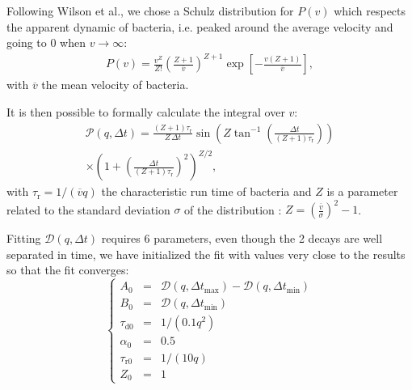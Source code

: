 \documentclass[%
 aip,
 jmp,%
 amsmath,amssymb,
reprint,%
]{revtex4-1}
\begin{document}
Following Wilson et al.\cite{1_BactMobil}, we chose a Schulz distribution for $P(v)$ which respects the apparent dynamic of bacteria, i.e. peaked around the average velocity and going to 0 when $v \rightarrow \infty$:
\begin{multline}
P(v) = \frac{v^Z}{Z!} \left(\frac{Z+1}{\overline{v}}\right)^{Z+1} \exp\left[-\frac{v(Z+1)}{\overline{v}}\right],
\end{multline}
with $\overline{v}$ the mean velocity of bacteria.

It is then possible to formally calculate the integral over $v$:
\begin{multline}
\mathcal{P}(q, \Delta t) = \frac{(Z+1)\tau_\text{r}}{Z \, \Delta t} \sin\left(Z\tan^{-1}\left(\frac{\Delta t}{(Z+1)\tau_\text{r}}\right)\right)\\
\times \left(1+\left(\frac{\Delta t}{(Z+1)\tau_\text{r}}\right)^2\right)^{Z/2},
\end{multline}
with $\tau_\text{r} = 1/(\overline{v}q)$ the characteristic run time of bacteria and $Z$ is a parameter related to the standard deviation $\sigma$ of the distribution : $Z = \left( \frac{\overline{v}}{\sigma} \right)^2 -1$. 

Fitting $\mathcal{D}(q, \Delta t)$ requires 6 parameters, even though the 2 decays are well separated in time, we have initialized the fit with values very close to the results so that the fit converges:
\begin{equation}
\left\{
\begin{array}{rcl}
A_0 &=& \mathcal{D} (q,\Delta t_\text{max}) - \mathcal{D} (q,\Delta t_\text{min}) \\
B_0 &=& \mathcal{D} (q,\Delta t_\text{min}) \\
\tau_\text{d0} &=& 1/(0.1 q^{2})\\
\alpha_0 &=& 0.5\\
\tau_\text{r0} &=& 1/(10 q)\\
Z_0 &=& 1
\end{array}
\right.
\end{equation}
\end{document}
